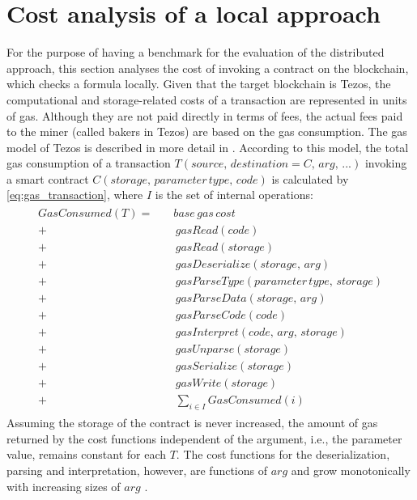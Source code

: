 \section{Cost analysis of a local approach}\label{sec:usecase_cost}
For the purpose of having a benchmark for the evaluation of the distributed approach, this section analyses the cost of invoking a contract on the blockchain, which checks a formula locally. Given that the target blockchain is Tezos, the computational and storage-related costs of a transaction are represented in units of gas. Although they are not paid directly in terms of fees, the actual fees paid to the miner (called bakers in Tezos) are based on the gas consumption. The gas model of Tezos is described in more detail in . According to this model, the total gas consumption of a transaction $T(source,\, destination=C,\, arg, \, ...)$ invoking a smart contract $C(storage, \, parameter\, type, \, code)$ is calculated by \eqref{eq:gas_transaction}, where $I$ is the set of internal operations:
\begin{align}\label{eq:gas_transaction}
\begin{split}
GasConsumed(T) = \quad &base \, gas \, cost \\
+& \, gasRead(code) \\
+& \, gasRead(storage) \\
+& \, gasDeserialize(storage, \, arg) \\
+& \, gasParseType(parameter \, type, \, storage) \\
+& \, gasParseData(storage, \, arg) \\
+& \, gasParseCode(code) \\
+& \, gasInterpret(code, \, arg, \, storage) \\
+& \, gasUnparse(storage) \\
+& \, gasSerialize(storage) \\
+& \, gasWrite(storage) \\
+& \, \sum_{i \in I} GasConsumed(i)
\end{split}
\end{align}
Assuming the storage of the contract is never increased, the amount of gas returned by the cost functions independent of the argument, i.e., the parameter value, remains constant for each $T$. The cost functions for the deserialization, parsing and interpretation, however, are functions of $arg$ and grow monotonically with increasing sizes of $arg$ \cite{morley_gasmodel}\cite{tezos_repo}.

